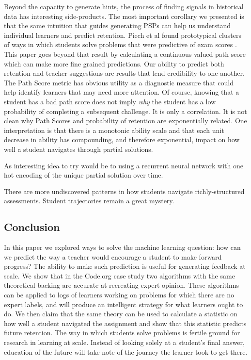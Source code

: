 Beyond the capacity to generate hints, the process of finding signals in historical data has interesting side-products. The most important corollary we presented is that the same intuition that guides generating PSPs can help us understand individual learners and predict retention. Piech et al found prototypical clusters of ways in which students solve problems that were predictive of exam scores \cite{piech2012modeling}. This paper goes beyond that result by calculating a continuous valued path score which can make more fine grained predictions. Our ability to predict both retention and teacher suggestions are results that lend credibility to one another. The Path Score metric has obvious utility as a diagnostic measure that could help identify learners that may need more attention. Of course, knowing that a student has a bad path score does not imply \emph{why} the student has a low probability of completing a subsequent challenge. It is only a correlation. It is not clean why Path Scores and probability of retention are exponentially related. One interpretation is that there is a monotonic ability scale and that each unit decrease in ability has compounding, and therefore exponential, impact on how well a student navigates through partial solutions. 

As interesting idea to try would be to using a recurrent neural network with one hot encoding of the unique partial solution over time.

There are more undiscovered patterns in how students navigate richly-structured assessments. Student trajectories remain a great mystery.

\subsection{Conclusion}

In this paper we explored ways to solve the machine learning question: how can we predict the way a teacher would encourage a student to make forward progress? The ability to make such prediction is useful for generating feedback at scale. We show that in the Code.org case study two algorithms with the same theoretical backing are accurate at recreating expert opinion. These algorithms can be applied to logs of learners working on problems for which there are no expert labels, and will produce an intelligent strategy for what learners ought to do. We then claim that the same theory can be used to calculate a statistic on how well a student navigated the assignment and show that this statistic predicts future retention. The way in which students solve problems is fertile ground for research in learning at scale. Instead of looking solely at a student's final answer, education of the future will take note of the journey the learner took to get there.